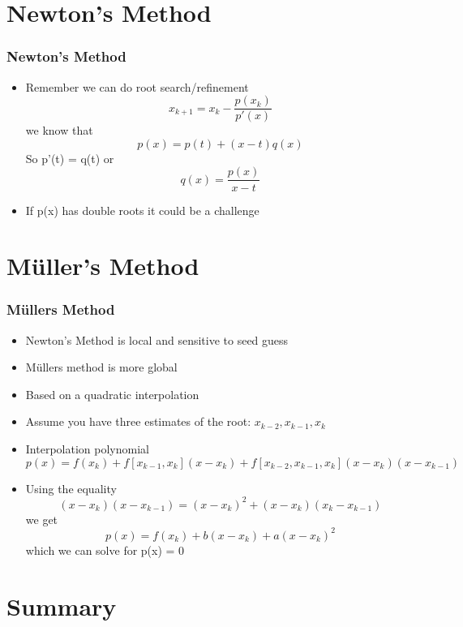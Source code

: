 \documentclass[10pt]{beamer}
\begin{document}
\section{Newton's Method}

\begin{frame}
  \frametitle{Newton's Method}
  \begin{itemize}
  \item Remember we can do root search/refinement
    \[
      x_{k+1} = x_k - \frac{p(x_k)}{p'(x)}
    \] we know that
    \[
      p(x) = p(t) + (x-t) q(x)
    \]
    So p'(t) = q(t) or
    \[
      q(x) = \frac{p(x)}{x-t}
    \]
  \item If p(x) has double roots it could be a challenge
  \end{itemize}
\end{frame}

\section{M{\"u}ller's Method}

\begin{frame}
  \frametitle{M\"ullers Method}
  \begin{itemize}
  \item Newton's Method is local and sensitive to seed guess    
  \item M\"ullers method is more global
  \item Based on a quadratic interpolation
  \item Assume you have three estimates of the root: $x_{k-2}, x_{k-1}, x_k$
  \item Interpolation polynomial
    \[
      p(x) = f(x_k)
      + f[x_{k-1}, x_k](x-x_k)
      + f[x_{k-2}, x_{k-1}, x_k](x-x_k)(x-x_{k-1})
    \]
  \item Using the equality
    \[
      (x-x_k)(x-x_{k-1}) = (x-x_k)^2 + (x-x_k)(x_k-x_{k-1})
    \] we get
    \[
      p(x) = f(x_k) + b (x-x_k) + a (x-x_k)^2
    \]
    which we can solve for p(x) = 0
  \end{itemize}
\end{frame}

\section{Summary}
\end{document}

